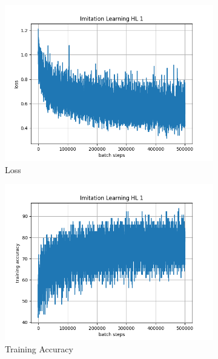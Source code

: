 \documentclass[10pt]{scrartcl}
\begin{document}
\begin{figure}[h]
    \begin{subfigure}{0.5\textwidth}
      \centering
      \includegraphics[width=\linewidth]{images/Il_hl1_loss.png}
      \caption{Loss}
      \label{fig:Il_hl1_loss}
    \end{subfigure} 
    \begin{subfigure}{0.5\textwidth}
      \centering
      \includegraphics[width=\linewidth]{images/Il_hl1_train.png}
      \caption{Training Accuracy}
      \label{fig:Il_hl1_train}
    \end{subfigure} \\
    \begin{subfigure}{0.5\textwidth}
      \centering

\end{subfigure}
\end{figure}
\end{document}
